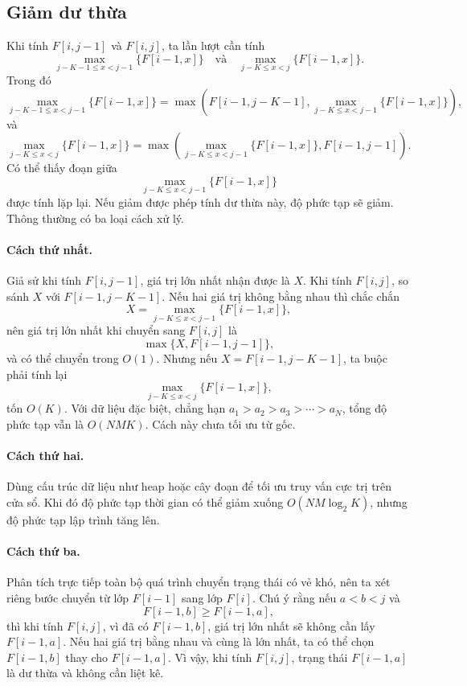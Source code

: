 \documentclass[11pt]{article}
\begin{document}
\subsection{Giảm dư thừa}

Khi tính $F[i,j-1]$ và $F[i,j]$, ta lần lượt cần tính
\[
  \max_{j-K-1\le x<j-1}\{F[i-1,x]\}
  \quad\text{và}\quad
  \max_{j-K\le x<j}\{F[i-1,x]\}.
\]
Trong đó
\[
  \max_{j-K-1\le x<j-1}\{F[i-1,x]\}
  =
  \max\left(
    F[i-1,j-K-1],
    \max_{j-K\le x<j-1}\{F[i-1,x]\}
  \right),
\]
và
\[
  \max_{j-K\le x<j}\{F[i-1,x]\}
  =
  \max\left(
    \max_{j-K\le x<j-1}\{F[i-1,x]\},
    F[i-1,j-1]
  \right).
\]
Có thể thấy đoạn giữa
\[
  \max_{j-K\le x<j-1}\{F[i-1,x]\}
\]
được tính lặp lại. Nếu giảm được phép tính dư thừa này, độ phức tạp sẽ giảm.
Thông thường có ba loại cách xử lý.

\paragraph{Cách thứ nhất.}
Giả sử khi tính $F[i,j-1]$, giá trị lớn nhất nhận được là $X$. Khi tính
$F[i,j]$, so sánh $X$ với $F[i-1,j-K-1]$. Nếu hai giá trị không bằng nhau thì
chắc chắn
\[
  X=\max_{j-K\le x<j-1}\{F[i-1,x]\},
\]
nên giá trị lớn nhất khi chuyển sang $F[i,j]$ là
\[
  \max\{X,F[i-1,j-1]\},
\]
và có thể chuyển trong $O(1)$. Nhưng nếu $X=F[i-1,j-K-1]$, ta buộc phải tính
lại
\[
  \max_{j-K\le x<j}\{F[i-1,x]\},
\]
tốn $O(K)$. Với dữ liệu đặc biệt, chẳng hạn
$a_1>a_2>a_3>\cdots>a_N$, tổng độ phức tạp vẫn là $O(NMK)$. Cách này chưa tối
ưu từ gốc.

\paragraph{Cách thứ hai.}
Dùng cấu trúc dữ liệu như heap hoặc cây đoạn để tối ưu truy vấn cực trị trên
cửa sổ. Khi đó độ phức tạp thời gian có thể giảm xuống $O(NM\log_2 K)$,
nhưng độ phức tạp lập trình tăng lên.

\paragraph{Cách thứ ba.}
Phân tích trực tiếp toàn bộ quá trình chuyển trạng thái có vẻ khó, nên ta
xét riêng bước chuyển từ lớp $F[i-1]$ sang lớp $F[i]$. Chú ý rằng nếu
$a<b<j$ và
\[
  F[i-1,b]\ge F[i-1,a],
\]
thì khi tính $F[i,j]$, vì đã có $F[i-1,b]$, giá trị lớn nhất sẽ không cần lấy
$F[i-1,a]$. Nếu hai giá trị bằng nhau và cùng là lớn nhất, ta có thể chọn
$F[i-1,b]$ thay cho $F[i-1,a]$. Vì vậy, khi tính $F[i,j]$, trạng thái
$F[i-1,a]$ là dư thừa và không cần liệt kê.
\end{document}
